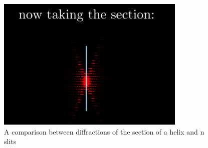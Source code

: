 \begin{figure}[H]
    \includegraphics[width=0.9\columnwidth]{figures/n slits section.jpg}
    \caption{A comparison between diffractions of the section of a helix and n slits}
    \label{fig:n slits section}
\end{figure}
